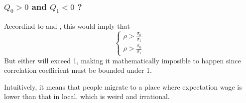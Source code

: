 \subsubsection{$Q_0>0$ and $Q_1<0$ ?}

Accordind to  and , this would imply that
$$
\begin{cases}
    \rho>\frac{\sigma_0}{\sigma_1}\\
    \rho>\frac{\sigma_0}{\sigma_1}
\end{cases}
$$
But either will exceed 1, making it mathematically imposible to happen since correlation coefficient must be bounded under 1.

Intuitively, it means that people migrate to a place where expectation wage is lower than that in local.
which is weird and irrational.